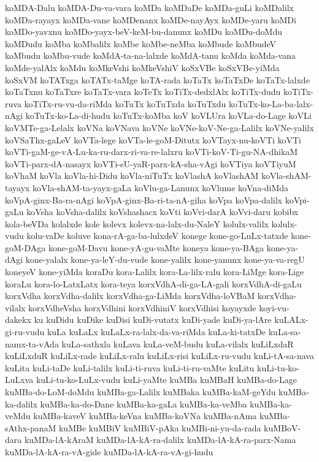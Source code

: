 {koMDA-Dalu
koMDA-Du-va-vara
koMDa
koMDaDe
koMDa-guLi
koMDalilx
koMDa-rayayx
koMDa-vane
koMDenanx
koMDe-nayAyx
koMDe-yaru
koMDi
koMDo-yavxnu
koMDo-yayx-beV-keM-bu-danunx
koMDu
koMDu-doMdu
koMDudu
koMba
koMbalilx
koMbe
koMbe-neMba
koMbude
koMbudeV
koMbudu
koMbu-vude
koMdA-ta-na-lalxde
koMdA-tanu
koMda
koMda-vana
koMde-yalAlx
koMdu
koMkeVshi
koMkeVshiV
koSxVBe
koSxVBe-yiMda
koSxVM
koTATxga
koTATx-taMge
koTA-rada
koTaTx
koTaTxDe
koTaTx-lalxde
koTaTxnu
koTaTxre
koTaTx-vara
koTeTx
koTiTx-dedxlAlx
koTiTx-dudu
koTiTx-ruva
koTiTx-ru-vu-da-riMda
koTuTx
koTuTxda
koTuTxdu
koTuTx-ko-La-ba-lalx-nAgi
koTuTx-ko-La-di-hudu
koTuTx-koMba
koV
koVLUra
koVLa-do-Lage
koVLi
koVMTe-ga-Lelalx
koVNa
koVNava
koVNe
koVNe-koV-Ne-ga-Lalilx
koVNe-yalilx
koVSaThx-gaLeV
koVTa-lege
koVTa-le-goM-Ditutx
koVTayx-nu-koVTi
koVTi
koVTi-gaM-ge-vA-Lu-ka-ru-darx-ri-va-re-lalxru
koVTi-koV-Ti-gu-NA-dhikaM
koVTi-parx-dA-nasayx
koVTi-sU-yaR-parx-kA-sha-vAgi
koVTiya
koVTiyuM
koVhaM
koVla
koVla-hi-Didu
koVla-niTuTx
koVlashA
koVlashAM
koVla-shAM-tayayx
koVla-shAM-ta-yayx-gaLa
koVlu-ga-Lanunx
koVlume
koVna-diMda
koVpA-ginx-Ba-ra-nAgi
koVpA-ginx-Ba-ri-ta-nA-giha
koVpa
koVpa-dalilx
koVpi-gaLu
koVsha
koVsha-dalilx
koVshashacx
koVti
koVvi-darA
koVvi-daru
kobibx
kola-beVDa
kolalxde
kole
kolevx
kolevx-na-lalx-du-NaleY
kolulx-valilx
kolulx-vudu
kolu-vaDe
koluve
kona-rA-ga-ba-lulxdeV
konege
kone-go-LuLx-tatxde
kone-goM-DAga
kone-goM-Davu
kone-yA-gu-vaMte
koneya
kone-ya-BAga
kone-ya-dAgi
kone-yalalx
kone-ya-leY-du-vude
kone-yalilx
kone-yanunx
kone-ya-va-regU
koneyeV
kone-yiMda
koraDu
kora-Lalilx
kora-La-lilx-ralu
kora-LiMge
kora-Lige
koraLu
kora-lo-LatxLatx
kora-teya
korxVdhA-di-ga-LA-gali
korxVdhA-di-gaLu
korxVdha
korxVdha-dalilx
korxVdha-ga-LiMda
korxVdha-loVBaM
korxVdha-vilalx
korxVdheVsha
korxVdhini
korxVdhiniV
korxVdhisi
koyayxde
koyi-vu-dakekx
ku
kuDidu
kuDike
kuDisi
kuDi-vutatx
kuDi-yade
kuDi-ya-lAre
kuLALx-gi-ru-vudu
kuLa
kuLaLx
kuLaLx-ra-lalx-da-va-riMda
kuLa-ki-tatxDe
kuLa-sa-namx-ta-vAda
kuLa-sathxla
kuLava
kuLa-veM-budu
kuLa-vilalx
kuLiLxdaR
kuLiLxduR
kuLiLx-rade
kuLiLx-ralu
kuLiLx-risi
kuLiLx-ru-vudu
kuLi-tA-sa-nava
kuLita
kuLi-taDe
kuLi-talilx
kuLi-ti-ruva
kuLi-ti-ru-vaMte
kuLitu
kuLi-tu-ko-LuLxva
kuLi-tu-ko-LuLx-vudu
kuLi-yaMte
kuMBa
kuMBaH
kuMBa-do-Lage
kuMBa-do-LoM-doMdu
kuMBa-ga-Lalilx
kuMBaka
kuMBa-kaM-geYdu
kuMBa-ka-dalilx
kuMBa-ka-do-Dane
kuMBa-ka-gaLa
kuMBa-ka-veMba
kuMBa-ka-veMdu
kuMBa-kaveV
kuMBa-keVna
kuMBa-koVNa
kuMBa-nAma
kuMBa-sAthx-panaM
kuMBe
kuMBiV
kuMBiV-pAka
kuMBi-ni-yu-da-rada
kuMBoV-dara
kuMDa-lA-kAraM
kuMDa-lA-kA-ra-dalilx
kuMDa-lA-kA-ra-parx-Nama
kuMDa-lA-kA-ra-vA-gide
kuMDa-lA-kA-ra-vA-gi-hudu
}
